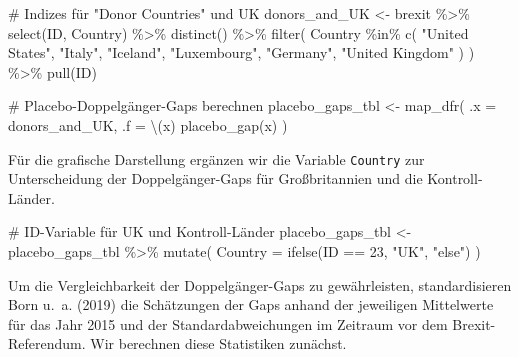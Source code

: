 \documentclass[
  a4paper,
  DIV=11,
  oneside]{scrreprt}
\newenvironment{Shaded}{\begin{snugshade}}{\end{snugshade}}
\newcommand{\AttributeTok}[1]{\textcolor[rgb]{0.40,0.45,0.13}{#1}}
\newcommand{\CommentTok}[1]{\textcolor[rgb]{0.37,0.37,0.37}{#1}}
\newcommand{\DecValTok}[1]{\textcolor[rgb]{0.68,0.00,0.00}{#1}}
\newcommand{\FunctionTok}[1]{\textcolor[rgb]{0.28,0.35,0.67}{#1}}
\newcommand{\NormalTok}[1]{\textcolor[rgb]{0.00,0.23,0.31}{#1}}
\newcommand{\OtherTok}[1]{\textcolor[rgb]{0.00,0.23,0.31}{#1}}
\newcommand{\SpecialCharTok}[1]{\textcolor[rgb]{0.37,0.37,0.37}{#1}}
\newcommand{\StringTok}[1]{\textcolor[rgb]{0.13,0.47,0.30}{#1}}
\begin{document}
\begin{Shaded}
\begin{Highlighting}[]
\CommentTok{\# Indizes für "Donor Countries" und UK}
\NormalTok{donors\_and\_UK }\OtherTok{\textless{}{-}}\NormalTok{ brexit }\SpecialCharTok{\%\textgreater{}\%} 
  \FunctionTok{select}\NormalTok{(ID, Country) }\SpecialCharTok{\%\textgreater{}\%} 
  \FunctionTok{distinct}\NormalTok{() }\SpecialCharTok{\%\textgreater{}\%}
  \FunctionTok{filter}\NormalTok{(}
\NormalTok{    Country }\SpecialCharTok{\%in\%} 
      \FunctionTok{c}\NormalTok{(}
        \StringTok{"United States"}\NormalTok{, }\StringTok{"Italy"}\NormalTok{, }\StringTok{"Iceland"}\NormalTok{, }
        \StringTok{"Luxembourg"}\NormalTok{, }\StringTok{"Germany"}\NormalTok{, }\StringTok{"United Kingdom"}
\NormalTok{      )}
\NormalTok{  ) }\SpecialCharTok{\%\textgreater{}\%}
  \FunctionTok{pull}\NormalTok{(ID)}
\end{Highlighting}
\end{Shaded}

\begin{Shaded}
\begin{Highlighting}[]
\CommentTok{\# Placebo{-}Doppelgänger{-}Gaps berechnen}
\NormalTok{placebo\_gaps\_tbl }\OtherTok{\textless{}{-}} \FunctionTok{map\_dfr}\NormalTok{(}
  \AttributeTok{.x =}\NormalTok{ donors\_and\_UK, }
  \AttributeTok{.f =}\NormalTok{  \textbackslash{}(x) }\FunctionTok{placebo\_gap}\NormalTok{(x) }
\NormalTok{)}
\end{Highlighting}
\end{Shaded}

Für die grafische Darstellung ergänzen wir die Variable \texttt{Country}
zur Unterscheidung der Doppelgänger-Gaps für Großbritannien und die
Kontroll-Länder.

\begin{Shaded}
\begin{Highlighting}[]
\CommentTok{\# ID{-}Variable für UK und Kontroll{-}Länder}
\NormalTok{placebo\_gaps\_tbl }\OtherTok{\textless{}{-}}\NormalTok{ placebo\_gaps\_tbl }\SpecialCharTok{\%\textgreater{}\%}
  \FunctionTok{mutate}\NormalTok{(}
    \AttributeTok{Country =} \FunctionTok{ifelse}\NormalTok{(ID }\SpecialCharTok{==} \DecValTok{23}\NormalTok{, }\StringTok{"UK"}\NormalTok{, }\StringTok{"else"}\NormalTok{)}
\NormalTok{  )}
\end{Highlighting}
\end{Shaded}

Um die Vergleichbarkeit der Doppelgänger-Gaps zu gewährleisten,
standardisieren Born u.~a. (2019) die Schätzungen der Gaps anhand der
jeweiligen Mittelwerte für das Jahr 2015 und der Standardabweichungen im
Zeitraum vor dem Brexit-Referendum. Wir berechnen diese Statistiken
zunächst.
\end{document}
